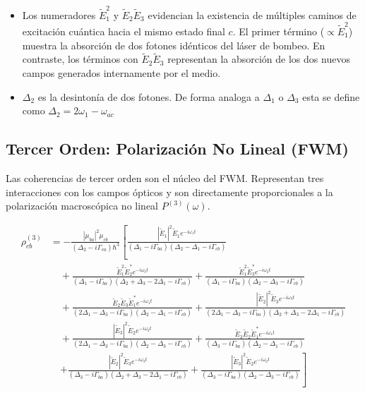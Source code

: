 \documentclass[12pt,a4paper]{article}
\begin{document}
\begin{itemize} 
    \item Los numeradores $\tilde{E}_1^2$ y $\tilde{E}_2\tilde{E}_3$ evidencian la existencia de múltiples caminos de excitación cuántica hacia el mismo estado final $c$. El primer término ($\propto \tilde{E}_1^2$) muestra la absorción de dos fotones idénticos del láser de bombeo. En contraste, los términos con $\tilde{E}_2\tilde{E}_3$ representan la absorción de los dos nuevos campos generados internamente por el medio.
    
    \item $\Delta_2$ es la desintonía de dos fotones. De forma analoga a $\Delta_1$ o $\Delta_3$ esta se define como $\Delta_2 = 2\omega_1 - \omega_{ac} $

\end{itemize}

\subsection*{Tercer Orden: Polarización No Lineal (FWM)}
Las coherencias de tercer orden son el núcleo del FWM. Representan tres interacciones con los campos ópticos y son directamente proporcionales a la polarización macroscópica no lineal $P^{(3)}(\omega)$.

\begin{equation}
\begin{aligned}
\rho_{cb}^{(3)} &= -\frac{|\mu_{ba}|^2 \mu_{cb}}{(\Delta_2 - i\Gamma_{ca})\hbar^3} \left[ \frac{|\tilde{E}_1|^2 \tilde{E}_1 e^{-i\omega_1 t}}{(\Delta_1 - i\Gamma_{ba})(\Delta_2 - \Delta_1 - i\Gamma_{cb})} \right. \\
&\quad + \frac{\tilde{E}_1^2 \tilde{E}_2^* e^{-i\omega_3 t}}{(\Delta_1 - i\Gamma_{ba})(\Delta_2 + \Delta_3 - 2\Delta_1 - i\Gamma_{cb})} + \frac{\tilde{E}_1^2 \tilde{E}_3^* e^{-i\omega_2 t}}{(\Delta_1 - i\Gamma_{ba})(\Delta_2 - \Delta_3 - i\Gamma_{cb})} \\
&\quad + \frac{\tilde{E}_2 \tilde{E}_3 \tilde{E}_1^* e^{-i\omega_1 t}}{(2\Delta_1 - \Delta_3 - i\Gamma_{ba})(\Delta_2 - \Delta_1 - i\Gamma_{cb})} + \frac{|\tilde{E}_2|^2 \tilde{E}_3 e^{-i\omega_3 t}}{(2\Delta_1 - \Delta_3 - i\Gamma_{ba})(\Delta_2 + \Delta_3 - 2\Delta_1 - i\Gamma_{cb})} \\
&\quad + \frac{|\tilde{E}_3|^2 \tilde{E}_2 e^{-i\omega_2 t}}{(2\Delta_1 - \Delta_3 - i\Gamma_{ba})(\Delta_2 - \Delta_3 - i\Gamma_{cb})} + \frac{\tilde{E}_3 \tilde{E}_2 \tilde{E}_1^* e^{-i\omega_1 t}}{(\Delta_3 - i\Gamma_{ba})(\Delta_2 - \Delta_1 - i\Gamma_{cb})} \\
&\quad \left. + \frac{|\tilde{E}_2|^2 \tilde{E}_3 e^{-i\omega_3 t}}{(\Delta_3 - i\Gamma_{ba})(\Delta_2 + \Delta_3 - 2\Delta_1 - i\Gamma_{cb})} + \frac{|\tilde{E}_3|^2 \tilde{E}_2 e^{-i\omega_2 t}}{(\Delta_3 - i\Gamma_{ba})(\Delta_2 - \Delta_3 - i\Gamma_{cb})} \right]
\end{aligned} \tag{4a}
\end{equation}
\end{document}
